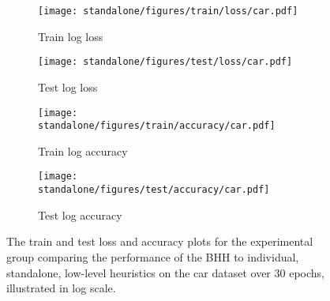 \begin{figure}[htpb]
	\begin{subfigure}{0.5\textwidth}
		\centering
		\texttt{[image: standalone/figures/train/loss/car.pdf]}
		\caption{Train log loss}
		\label{fig:results:standalone:figures:loss:train:car}
	\end{subfigure}
	\begin{subfigure}{0.5\textwidth}
		\centering
		\texttt{[image: standalone/figures/test/loss/car.pdf]}
		\caption{Test log loss}
		\label{fig:results:standalone:figures:loss:test:car}
	\end{subfigure}
	\par\bigskip
	\par\bigskip
	\begin{subfigure}{0.5\textwidth}
		\centering
		\texttt{[image: standalone/figures/train/accuracy/car.pdf]}
		\caption{Train log accuracy}
		\label{fig:results:standalone:figures:accuracy:train:car}
	\end{subfigure}
	\begin{subfigure}{0.5\textwidth}
		\centering
		\texttt{[image: standalone/figures/test/accuracy/car.pdf]}
		\caption{Test log accuracy}
		\label{fig:results:standalone:figures:accuracy:test:car}
	\end{subfigure}
	\par\bigskip
	\caption{The train and test loss and accuracy plots for the experimental group comparing the performance of the \acs{BHH} to individual, standalone, low-level heuristics on the car dataset over 30 epochs, illustrated in log scale.}
	\label{fig:results:standalone:figures:car}
\end{figure}

